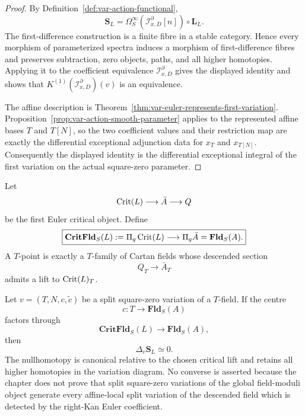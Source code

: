 \begin{proof}
By Definition~\ref{def:var-action-functional},
\[
    \mathbf S_L
    =
    \Omega_S^\infty(\mathcal I^\partial_{x,D}[n])
    \circ
    \mathbf L_L.
\]
The first-difference construction is a finite fibre in a stable category. Hence every morphism of parameterized spectra induces a morphism of first-difference fibres and preserves subtraction, zero objects, paths, and all higher homotopies. Applying it to the coefficient equivalence \(\mathcal I^\partial_{x,D}\) gives the displayed identity and shows that
\(K^{(1)}(\mathcal I^\partial_{x,D})(v)\) is an equivalence.

The affine description is Theorem~\ref{thm:var-euler-represents-first-variation}. Proposition~\ref{prop:var-action-smooth-parameter} applies to the represented affine bases \(T\) and \(T[N]\), so the two coefficient values and their restriction map are exactly the differential exceptional adjunction data for \(x_T\) and \(x_{T[N]}\). Consequently the displayed identity is the differential exceptional integral of the first variation on the actual square-zero parameter.
\end{proof}

\begin{definition}
\label{def:var-critical-field-moduli}
Let
\[
    \operatorname{Crit}(L)\longrightarrow\bar A\longrightarrow Q
\]
be the first Euler critical object. Define
\[
    \boxed{
    \mathbf{CritFld}_S(L)
    :=
    \Pi_q\operatorname{Crit}(L)
    \longrightarrow
    \Pi_q\bar A
    =
    \mathbf{Fld}_S(A).
    }
\]
A \(T\)-point is exactly a \(T\)-family of Cartan fields whose descended section
\[
    Q_T\to\bar A_T
\]
admits a lift to \(\operatorname{Crit}(L)_T\).
\end{definition}

\begin{theorem}
\label{thm:var-critical-stationary}
Let \(v=(T,N,c,\widetilde c)\) be a split square-zero variation of a \(T\)-field. If the centre
\[
    c:T\longrightarrow\mathbf{Fld}_S(A)
\]
factors through
\[
    \mathbf{CritFld}_S(L)\longrightarrow\mathbf{Fld}_S(A),
\]
then
\[
    \boxed{
    \Delta_v\mathbf S_L\simeq0.
    }
\]
The nullhomotopy is canonical relative to the chosen critical lift and retains all higher homotopies in the variation diagram. No converse is asserted because the chapter does not prove that split square-zero variations of the global field-moduli object generate every affine-local split variation of the descended field which is detected by the right-Kan Euler coefficient.
\end{theorem}

